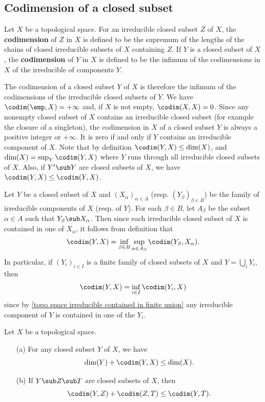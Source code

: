 \subsection{Codimension of a closed subset}
Let $X$ be a topological space. For an irreducible closed subset $Z$ of $X$, the \textbf{codimension} of $Z$ in $X$ is defined to be the supremum of the lengths of the chains of closed irreducible subsets of $X$ containing $Z$. If $Y$ is a closed subset of $X$, the \textbf{codimension} of $Y$ in $X$ is defined to be the infimum of the codimensions in $X$ of the irreducible of components $Y$.\par
The codimension of a closed subset $Y$ of $X$ is therefore the infimum of the codimensions of the irreducible closed subsets of $Y$. We have $\codim(\emp,X)=+\infty$ and, if $X$ is not empty, $\codim(X,X)=0$. Since any nonempty closed subset of $X$ contains an irreducible closed subset (for example the closure of a singleton), the codimension in $X$ of a closed subset $Y$ is always a positive integer or $+\infty$. It is zero if and only if $Y$ contains an irreducible component of $X$. Note that by definition $\codim(Y,X)\leq\dim(X)$, and $\dim(X)=\sup_Y\codim(Y,X)$ where $Y$ runs through all irreducible closed subsets of $X$. Also, if $Y'\sub Y$ are closed subsets of $X$, we have $\codim(Y,X)\leq\codim(Y,X)$.\par
Let $Y$ be a closed subset of $X$ and $(X_\alpha)_{\alpha\in A}$ (resp. $(Y_\beta)_{\beta\in B}$) be the family of irreducible components of $X$ (resp. of $Y$). For each $\beta\in B$, let $A_\beta$ be the subset $\alpha\in A$ such that $Y_\beta\sub X_\alpha$. Then since each irreducible closed subset of $X$ is contained in one of $X_\alpha$, it follows from definition that
\begin{align}\label{topo space codim is inf of component}
\codim(Y,X)=\inf_{\beta\in B}\sup_{\alpha\in A_\beta}\codim(Y_\beta,X_\alpha).
\end{align}
In particular, if $(Y_i)_{i\in I}$ is a finite family of closed subsets of $X$ and $Y=\bigcup_iY_i$, then
\[\codim(Y,X)=\inf_{i\in I}\codim(Y_i,X)\]
since by \cref{topo space irreducible contained in finite union} any irreducible component of $Y$ is contained in one of the $Y_i$.
\begin{proposition}\label{topo space codim prop}
Let $X$ be a topological space.
\begin{itemize}
\item[(a)] For any closed subset $Y$ of $X$, we have
\[\dim(Y)+\codim(Y,X)\leq\dim(X).\]  
\item[(b)] If $Y\sub Z\sub T$ are closed subsets of $X$, then
\[\codim(Y,Z)+\codim(Z,T)\leq\codim(Y,T).\] 
\end{itemize}
\end{proposition}
